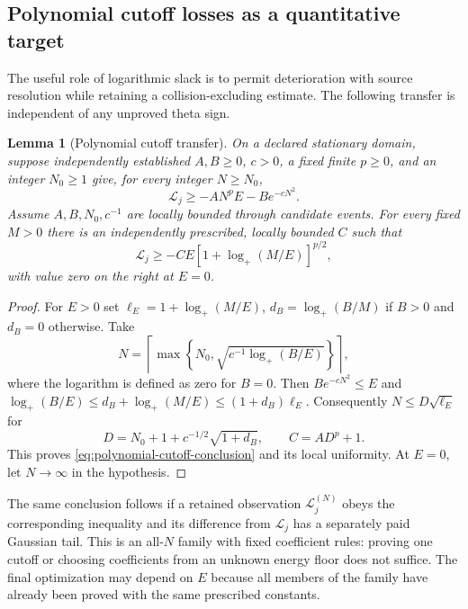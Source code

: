 \documentclass[11pt]{article}
\numberwithin{equation}{section}
\newtheorem{lemma}[theorem]{Lemma}
\theoremstyle{definition}
\theoremstyle{remark}
\newcommand{\Lag}{\mathcal L}
\begin{document}
\subsection{Polynomial cutoff losses as a quantitative target}
\label{subsec:polynomial-cutoff-transfer}

The useful role of logarithmic slack is to permit deterioration with
source resolution while retaining a collision-excluding estimate.  The
following transfer is independent of any unproved theta sign.

\begin{lemma}[Polynomial cutoff transfer]
\label{lem:polynomial-cutoff-transfer}
On a declared stationary domain, suppose independently established
$A,B\ge0$, $c>0$, a fixed finite $p\ge0$, and an integer $N_0\ge1$
give, for every integer $N\ge N_0$,
\begin{equation}
 \Lag_j\ge-A N^p E-B e^{-cN^2}.
 \label{eq:polynomial-cutoff-hypothesis}
\end{equation}
Assume $A,B,N_0,c^{-1}$ are locally bounded through candidate events.
For every fixed $M>0$ there is an independently prescribed, locally
bounded $C$ such that
\begin{equation}
 \Lag_j\ge-C E[1+\log_+(M/E)]^{p/2},
 \label{eq:polynomial-cutoff-conclusion}
\end{equation}
with value zero on the right at $E=0$.
\end{lemma}
\begin{proof}
For $E>0$ set $\ell_E=1+\log_+(M/E)$,
$d_B=\log_+(B/M)$ if $B>0$ and $d_B=0$ otherwise.  Take
\[
 N=\left\lceil\max\left\{N_0,
       \sqrt{c^{-1}\log_+(B/E)}\right\}\right\rceil,
\]
where the logarithm is defined as zero for $B=0$.  Then
$B e^{-cN^2}\le E$ and
$\log_+(B/E)\le d_B+\log_+(M/E)\le(1+d_B)\ell_E$.
Consequently $N\le D\sqrt{\ell_E}$ for
\[
 D=N_0+1+c^{-1/2}\sqrt{1+d_B},\qquad C=AD^p+1.
\]
This proves \eqref{eq:polynomial-cutoff-conclusion} and its local
uniformity.  At $E=0$, let $N\to\infty$ in the hypothesis.
\end{proof}

The same conclusion follows if a retained observation
$\Lag_j^{(N)}$ obeys the corresponding inequality and its difference
from $\Lag_j$ has a separately paid Gaussian tail.  This is an
all-$N$ family with fixed coefficient rules: proving one cutoff or
choosing coefficients from an unknown energy floor does not suffice.
The final optimization may depend on $E$ because all members of the
family have already been proved with the same prescribed constants.
\end{document}
